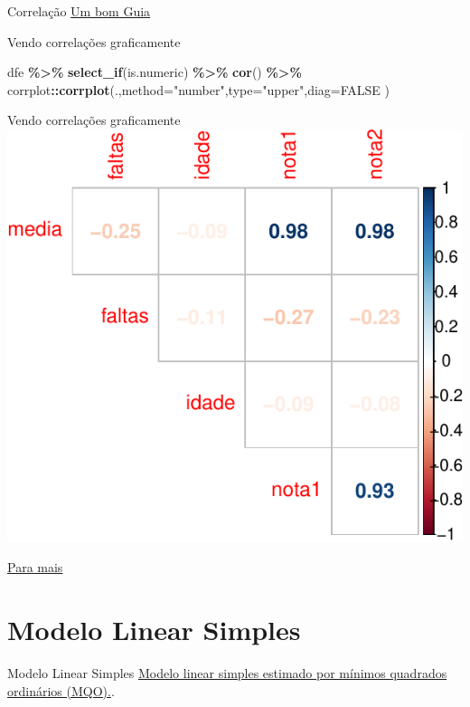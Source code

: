 \documentclass[
  9pt,
  ignorenonframetext,
  aspectratio=169]{beamer}
\newenvironment{Shaded}{\begin{snugshade}}{\end{snugshade}}
\newcommand{\DataTypeTok}[1]{\textcolor[rgb]{0.13,0.29,0.53}{#1}}
\newcommand{\KeywordTok}[1]{\textcolor[rgb]{0.13,0.29,0.53}{\textbf{#1}}}
\newcommand{\NormalTok}[1]{#1}
\newcommand{\OperatorTok}[1]{\textcolor[rgb]{0.81,0.36,0.00}{\textbf{#1}}}
\newcommand{\OtherTok}[1]{\textcolor[rgb]{0.56,0.35,0.01}{#1}}
\newcommand{\StringTok}[1]{\textcolor[rgb]{0.31,0.60,0.02}{#1}}
\begin{document}
\begin{frame}[fragile]{Correlação}
\protect\hypertarget{correlauxe7uxe3o-1}{}
\href{http://www.sthda.com/english/wiki/correlation-analyses-in-r}{Um
bom Guia}

Vendo correlações graficamente

\begin{Shaded}
\begin{Highlighting}[]
\NormalTok{dfe }\OperatorTok{\%\textgreater{}\%}\StringTok{ }\KeywordTok{select\_if}\NormalTok{(is.numeric) }\OperatorTok{\%\textgreater{}\%}\StringTok{ }\KeywordTok{cor}\NormalTok{() }\OperatorTok{\%\textgreater{}\%}
\StringTok{  }\NormalTok{corrplot}\OperatorTok{::}\KeywordTok{corrplot}\NormalTok{(.,}\DataTypeTok{method=}\StringTok{"number"}\NormalTok{,}\DataTypeTok{type=}\StringTok{"upper"}\NormalTok{,}\DataTypeTok{diag=}\OtherTok{FALSE}\NormalTok{ )}
\end{Highlighting}
\end{Shaded}
\end{frame}

\begin{frame}{Vendo correlações graficamente}
\protect\hypertarget{vendo-correlauxe7uxf5es-graficamente}{}
\includegraphics{aula_11_files/figure-beamer/unnamed-chunk-36-1.pdf}

\href{http://www.sthda.com/english/wiki/visualize-correlation-matrix-using-correlogram}{Para
mais}
\end{frame}

\hypertarget{modelo-linear-simples}{%
\section{Modelo Linear Simples}\label{modelo-linear-simples}}

\begin{frame}{Modelo Linear Simples}
\href{https://fmeireles.shinyapps.io/modelagem_r/}{Modelo linear simples
estimado por mínimos quadrados ordinários (MQO).}.
\end{frame}
\end{document}
